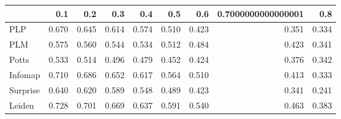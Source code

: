\begin{tabular}{lrrrrrrrr}
\toprule
{} &   0.1 &   0.2 &   0.3 &   0.4 &   0.5 &   0.6 & 0.7000000000000001 &   0.8 \\
\midrule
PLP      & 0.670 & 0.645 & 0.614 & 0.574 & 0.510 & 0.423 &              0.351 & 0.334 \\
PLM      & 0.575 & 0.560 & 0.544 & 0.534 & 0.512 & 0.484 &              0.423 & 0.341 \\
Potts    & 0.533 & 0.514 & 0.496 & 0.479 & 0.452 & 0.424 &              0.376 & 0.342 \\
Infomap  & 0.710 & 0.686 & 0.652 & 0.617 & 0.564 & 0.510 &              0.413 & 0.333 \\
Surprise & 0.640 & 0.620 & 0.589 & 0.548 & 0.489 & 0.423 &              0.341 & 0.241 \\
Leiden   & 0.728 & 0.701 & 0.669 & 0.637 & 0.591 & 0.540 &              0.463 & 0.383 \\
\bottomrule
\end{tabular}
